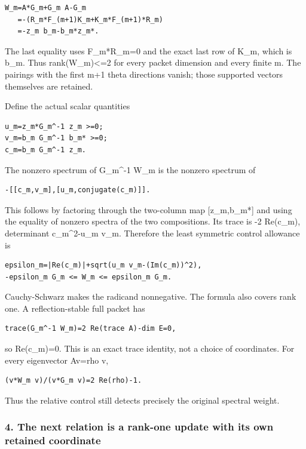 \begin{verbatim}
W_m=A*G_m+G_m A-G_m
   =-(R_m*F_(m+1)K_m+K_m*F_(m+1)*R_m)
   =-z_m b_m-b_m*z_m*.
\end{verbatim}

The last equality uses F\_m*R\_m=0 and the exact last row of K\_m, which is b\_m. Thus
rank(W\_m)\textless=2 for every packet dimension and every finite m. The pairings with the first m+1
theta directions vanish; those supported vectors themselves are retained.

Define the actual scalar quantities

\begin{verbatim}
u_m=z_m*G_m^-1 z_m >=0;
v_m=b_m G_m^-1 b_m* >=0;
c_m=b_m G_m^-1 z_m.
\end{verbatim}

The nonzero spectrum of G\_m\^{}-1 W\_m is the nonzero spectrum of

\begin{verbatim}
-[[c_m,v_m],[u_m,conjugate(c_m)]].
\end{verbatim}

This follows by factoring through the two-column map {[}z\_m,b\_m*{]} and using the equality of
nonzero spectra of the two compositions. Its trace is -2 Re(c\_m), determinant
\textbar c\_m\textbar\^{}2-u\_m v\_m. Therefore the least symmetric control allowance is

\begin{verbatim}
epsilon_m=|Re(c_m)|+sqrt(u_m v_m-(Im(c_m))^2),
-epsilon_m G_m <= W_m <= epsilon_m G_m.
\end{verbatim}

Cauchy-Schwarz makes the radicand nonnegative. The formula also covers rank one. A reflection-stable
full packet has

\begin{verbatim}
trace(G_m^-1 W_m)=2 Re(trace A)-dim E=0,
\end{verbatim}

so Re(c\_m)=0. This is an exact trace identity, not a choice of coordinates. For every eigenvector
Av=rho v,

\begin{verbatim}
(v*W_m v)/(v*G_m v)=2 Re(rho)-1.
\end{verbatim}

Thus the relative control still detects precisely the original spectral weight.

\subsubsection{4. The next relation is a rank-one update with its own retained
coordinate}\label{pr_13:the-next-relation-is-a-rank-one-update-with-its-own-retained-coordinate}

